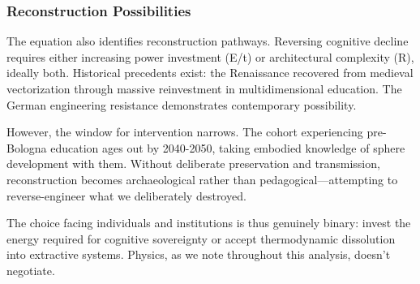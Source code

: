 \subsubsection{Reconstruction Possibilities}

The equation also identifies reconstruction pathways. Reversing cognitive decline requires either increasing power investment (E/t) or architectural complexity (R), ideally both. Historical precedents exist: the Renaissance recovered from medieval vectorization through massive reinvestment in multidimensional education. The German engineering resistance demonstrates contemporary possibility.

However, the window for intervention narrows. The cohort experiencing pre-Bologna education ages out by 2040-2050, taking embodied knowledge of sphere development with them. Without deliberate preservation and transmission, reconstruction becomes archaeological rather than pedagogical—attempting to reverse-engineer what we deliberately destroyed.

The choice facing individuals and institutions is thus genuinely binary: invest the energy required for cognitive sovereignty or accept thermodynamic dissolution into extractive systems. Physics, as we note throughout this analysis, doesn't negotiate.
